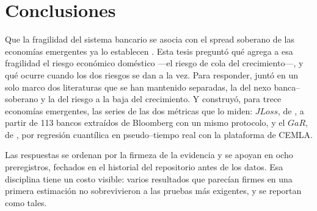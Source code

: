 \chapter{Conclusiones}
\label{sec:conclusiones}

Que la fragilidad del sistema bancario se asocia con el spread soberano de las economías emergentes ya lo establecen \citet{Chari2024b}. Esta tesis preguntó qué agrega a esa fragilidad el riesgo económico doméstico ---el riesgo de cola del crecimiento---, y qué ocurre cuando los dos riesgos se dan a la vez. Para responder, juntó en un solo marco dos literaturas que se han mantenido separadas, la del nexo banca--soberano y la del riesgo a la baja del crecimiento. Y construyó, para trece economías emergentes, las series de las dos métricas que lo miden: $JLoss$, de \citet{Chari2024b}, a partir de 113 bancos extraídos de Bloomberg con un mismo protocolo, y el $GaR$, de \citet{ABG2019b}, por regresión cuantílica en pseudo--tiempo real con la plataforma de CEMLA.

Las respuestas se ordenan por la firmeza de la evidencia y se apoyan en ocho preregistros, fechados en el historial del repositorio antes de los datos. Esa disciplina tiene un costo visible: varios resultados que parecían firmes en una primera estimación no sobrevivieron a las pruebas más exigentes, y se reportan como tales.

